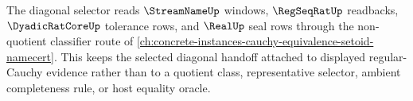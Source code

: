 The diagonal selector reads $\StreamNameUp$ windows, $\RegSeqRatUp$ readbacks, $\DyadicRatCoreUp$ tolerance rows, and $\RealUp$ seal rows through the non-quotient classifier route of \autoref{ch:concrete-instances-cauchy-equivalence-setoid-namecert}. This keeps the selected diagonal handoff attached to displayed regular-Cauchy evidence rather than to a quotient class, representative selector, ambient completeness rule, or host equality oracle.
